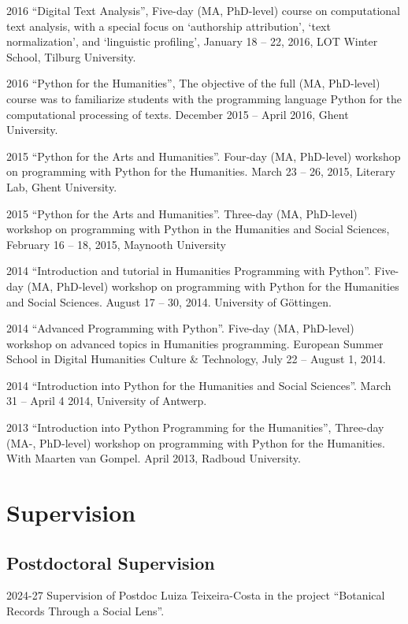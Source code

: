 \documentclass[12pt,letterpaper]{report}
\begin{document}
\begin{tablist}
  \item[2016] \tab{}``Digital Text Analysis'', Five-day (MA, PhD-level) course on
    computational text analysis, with a special focus on `authorship attribution', `text
    normalization', and `linguistic profiling', January 18 -- 22, 2016, LOT Winter School,
    Tilburg University.
  \item[2016] \tab{}``Python for the Humanities'', The objective of the full (MA,
    PhD-level) course was to familiarize students with the programming language Python for
    the computational processing of texts. December 2015 -- April 2016, Ghent University. 
  \item[2015] \tab{}``Python for the Arts and Humanities''. Four-day (MA, PhD-level)
    workshop on programming with Python for the Humanities. March 23 -- 26, 2015, Literary
    Lab, Ghent University.
  \item[2015] \tab{}``Python for the Arts and Humanities''. Three-day (MA, PhD-level)
    workshop on programming with Python in the Humanities and Social Sciences, February 16
    -- 18, 2015, Maynooth University
  \item[2014] \tab{}``Introduction and tutorial in Humanities Programming with Python''.
    Five-day (MA, PhD-level) workshop on programming with Python for the Humanities and
    Social Sciences. August 17 -- 30, 2014. University of Göttingen. 
  \item[2014] \tab{}``Advanced Programming with Python''. Five-day (MA, PhD-level)
    workshop on advanced topics in Humanities programming. European Summer School in
    Digital Humanities Culture \& Technology, July 22 -- August 1, 2014. 
  \item[2014] \tab{}``Introduction into Python for the Humanities and Social Sciences''.
    March 31 -- April 4 2014, University of Antwerp. 
  \item[2013] \tab{}``Introduction into Python Programming for the Humanities'', Three-day
    (MA-, PhD-level) workshop on programming with Python for the Humanities. With
    Maarten van Gompel. April 2013, Radboud University.
  \end{tablist}

  \section*{Supervision}
  \subsection*{Postdoctoral Supervision}
  \begin{tablist}
    \item[2024-27] \tab{}Supervision of Postdoc Luiza Teixeira-Costa in the
      project ``Botanical Records Through a Social Lens''.
    \end{tablist}
\end{document}
